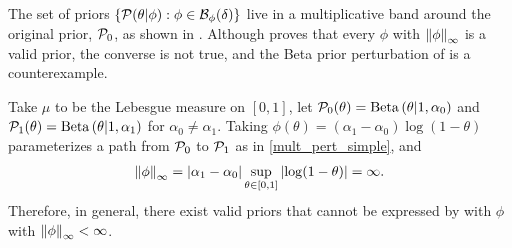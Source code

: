 The set of priors $\left\{\mathcal{P}(\theta \vert \phi) : \phi \in
\mathcal{B}_\phi(\delta)\right\}$ live in a multiplicative band around the original
prior, $\mathcal{P}_{0}$, as shown in . Although
 proves that every $\phi$ with $\left\Vert\phi\right\Vert_{\infty}$ is a
valid prior, the converse is not true, and the Beta prior perturbation of
 is a counterexample.

\FunctionBallFig{}


\begin{ex}
%
Take $\mu$ to be the Lebesgue measure on $[0,1]$, let $\mathcal{P}_{0}(\theta) =
\mathrm{Beta}\left(\theta \vert 1, \alpha_0\right)$ and $\mathcal{P}_{1}(\theta) = \mathrm{Beta}\left(\theta \vert
1, \alpha_1\right)$ for $\alpha_0 \ne \alpha_1$.  Taking
$\phi(\theta) = (\alpha_1 - \alpha_0) \log(1 - \theta)$ parameterizes
a path from $\mathcal{P}_{0}$ to $\mathcal{P}_{1}$ as in \eqref{mult_pert_simple}, and
%
\begin{align*}
%
\norminf{\phi} =
    \abs{\alpha_1 - \alpha_0} \sup_{\theta \in [0,1]} \abs{\log(1 - \theta)} =
    \infty.
%
\end{align*}
%
Therefore, in general, there exist valid priors that cannot be expressed by
 with $\phi$ with $\left\Vert\phi\right\Vert_{\infty} < \infty$.
%
\end{ex}
